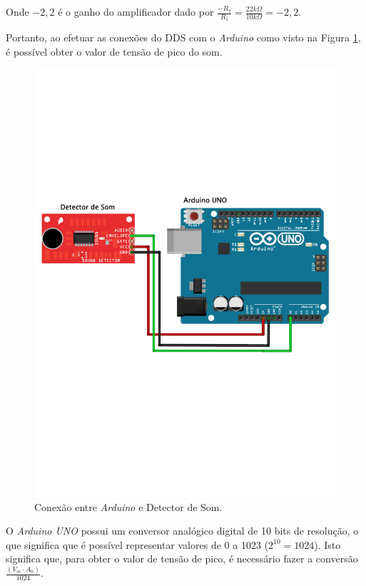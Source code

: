\documentclass[
    12pt,               %
    openright,          %
    oneside,
    a4paper,            
    english,            %
    brazil              %
    ]{abntex2}
\begin{document}
Onde $-2,2$ é o ganho do amplificador dado por $\frac{-R_7}{R_1} = \frac{22k\Omega}{10k\Omega} = -2,2$.

Portanto, ao efetuar as conexões do DDS com o \textit{Arduino} como visto na Figura \ref{circ}, é possível obter o valor de tensão de pico do som. 

\begin{figure}[!htb]
  \begin{center}
    \caption{\label{circ}Conexão entre \textit{Arduino} e Detector de Som.}
    \includegraphics[scale=0.41]{images/circ-1.pdf}
  \end{center}
\end{figure}

O \textit{Arduino UNO} possui um conversor analógico digital de 10 bits de resolução, o que significa que é possível representar valores de 0 a 1023 ($2^{10}=1024$). Isto significa que, para obter o valor de tensão de pico, é necessário fazer a conversão $\frac{(V_{cc}\cdot A_0)}{1024}$. 
\end{document}
